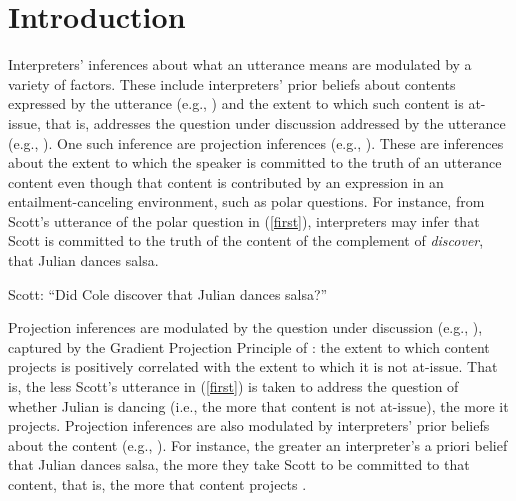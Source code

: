 \documentclass[11pt,fleqn]{article}
\newcommand{\6}{\mbox{$[\hspace*{-.6mm}[$}}
\newcommand{\9}{\mbox{$]\hspace*{-.6mm}]$}}
\begin{document}
\clearpage
{} 

\newpage


\section{Introduction}\label{s1}

Interpreters' inferences about what an utterance means are modulated by a variety of factors. These include interpreters' prior beliefs about contents expressed by the utterance (e.g., \citealt{winograd1972,chambers-etal04,hagoort-etal2004,degen-etal2015}) and the extent to which such content is at-issue, that is, addresses the question under discussion addressed by the utterance (e.g., \citealt{Zondervan2010,degen-goodman2014,ronai2020}). One such inference are projection inferences (e.g., \citealt{langendoen-savin71,potts05}). These are inferences about the extent to which the speaker is committed to the truth of an utterance content even though that content is contributed by an expression in an entailment-canceling environment, such as polar questions. For instance, from Scott's utterance of the polar question in (\ref{first}), interpreters may infer that Scott is committed to the truth of the content of the complement of {\em discover}, that Julian dances salsa. 

\begin{exe}
\ex\label{first} Scott: ``Did Cole discover that Julian dances salsa?''
\end{exe}
Projection inferences are modulated by the question under discussion (e.g., \citealt{cummins-rohde2015,tonhauser-etal-eval}), captured by the  Gradient Projection Principle of \citet{tbd-variability}:  the extent to which content projects is positively correlated with the extent to which it is not at-issue. That is, the less Scott's utterance in (\ref{first}) is taken to address the question of whether Julian is dancing (i.e., the more that content is not at-issue), the more it projects. Projection inferences are also modulated by interpreters' prior beliefs about the content (e.g.,  \citealt{mahler2020}). For instance, the greater an interpreter's a priori belief that Julian dances salsa, the more  they take Scott to be committed to that content, that is, the more that content projects \citep{degen-tonhauser-openmind}.
\end{document}
